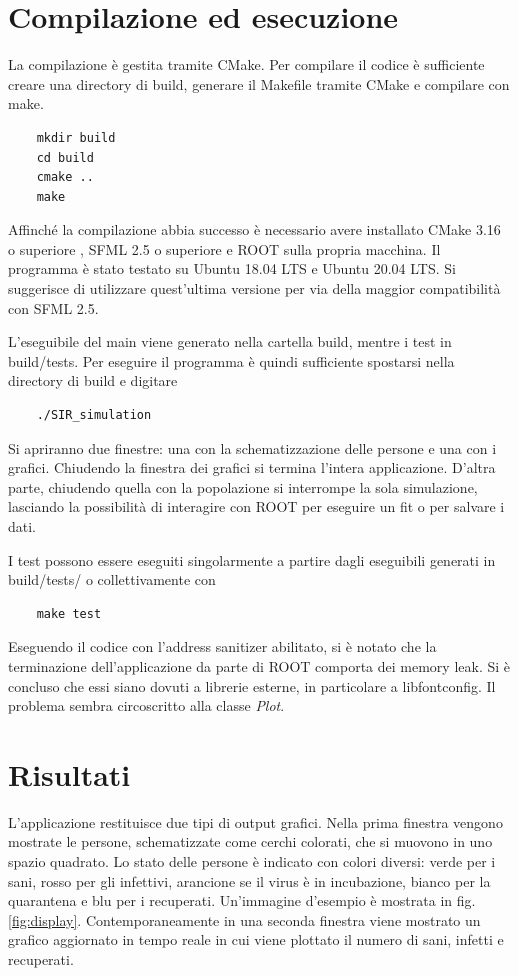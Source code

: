 \documentclass[a4paper,10pt,twocolumn]{article}
\begin{document}
\section{Compilazione ed esecuzione}
La compilazione è gestita tramite CMake. Per compilare il codice è sufficiente creare una directory di build, generare il Makefile tramite CMake e compilare con make.

\begin{verbatim}
    mkdir build
    cd build
    cmake ..
    make
\end{verbatim}

Affinché la compilazione abbia successo è necessario avere installato CMake 3.16 o superiore \cite{bib:CMake}, SFML 2.5 o superiore \cite{bib:SFML} e ROOT \cite{bib:ROOT} sulla propria macchina. Il programma è stato testato su Ubuntu 18.04 LTS e Ubuntu 20.04 LTS. Si suggerisce di utilizzare quest'ultima versione per via della maggior compatibilità con SFML 2.5.

L'eseguibile del main viene generato nella cartella build, mentre i test in build/tests. Per eseguire il programma è quindi sufficiente spostarsi nella directory di build e digitare

\begin{verbatim}
    ./SIR_simulation
\end{verbatim}

Si apriranno due finestre: una con la schematizzazione delle persone e una con i grafici. Chiudendo la finestra dei grafici si termina l'intera applicazione. D'altra parte, chiudendo quella con la popolazione si interrompe la sola simulazione, lasciando la possibilità di interagire con ROOT per eseguire un fit o per salvare i dati.

I test possono essere eseguiti singolarmente a partire dagli eseguibili generati in build/tests/ o collettivamente con

\begin{verbatim}
    make test
\end{verbatim}

Eseguendo il codice con l'address sanitizer abilitato, si è notato che la terminazione dell'applicazione da parte di ROOT comporta dei memory leak. Si è concluso che essi siano dovuti a librerie esterne, in particolare a libfontconfig. Il problema sembra circoscritto alla classe \emph{Plot}.

\section{Risultati}
\label{sec:risultati}
L'applicazione restituisce due tipi di output grafici. Nella prima finestra vengono mostrate le persone, schematizzate come cerchi colorati, che si muovono in uno spazio quadrato. Lo stato delle persone è indicato con colori diversi: verde per i sani, rosso per gli infettivi, arancione se il virus è in incubazione, bianco per la quarantena e blu per i recuperati. Un'immagine d'esempio è mostrata in fig. \ref{fig:display}. Contemporaneamente in una seconda finestra viene mostrato un grafico aggiornato in tempo reale in cui viene plottato il numero di sani, infetti e recuperati.
\end{document}
